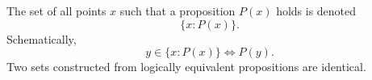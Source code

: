 The set of all points $x$ such that a proposition $P(x)$ holds is denoted
$$
\{x : P(x)\}.
$$
Schematically,
$$
y \in \{x : P(x)\} \iff P(y).
$$
Two sets constructed from logically equivalent propositions are identical.
